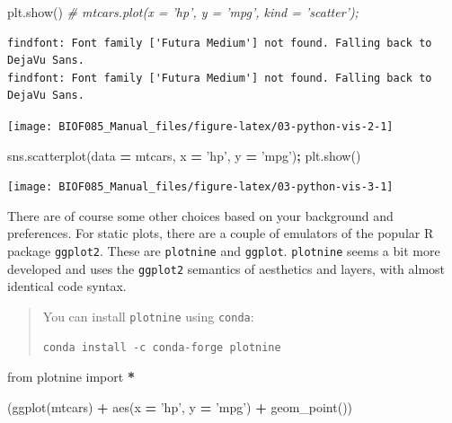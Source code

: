 \documentclass[
  letterpaper,
]{scrbook}
\newenvironment{Shaded}{\begin{snugshade}}{\end{snugshade}}
\newcommand{\CommentTok}[1]{\textcolor[rgb]{0.56,0.35,0.01}{\textit{#1}}}
\newcommand{\ImportTok}[1]{#1}
\newcommand{\NormalTok}[1]{#1}
\newcommand{\OperatorTok}[1]{\textcolor[rgb]{0.81,0.36,0.00}{\textbf{#1}}}
\newcommand{\StringTok}[1]{\textcolor[rgb]{0.31,0.60,0.02}{#1}}
\begin{document}
\begin{Shaded}
\begin{Highlighting}[]
\NormalTok{plt.show()}
\CommentTok{# mtcars.plot(x = 'hp', y = 'mpg', kind = 'scatter');}
\end{Highlighting}
\end{Shaded}

\begin{verbatim}
findfont: Font family ['Futura Medium'] not found. Falling back to DejaVu Sans.
findfont: Font family ['Futura Medium'] not found. Falling back to DejaVu Sans.
\end{verbatim}

\begin{center}\texttt{[image: BIOF085\_Manual\_files/figure-latex/03-python-vis-2-1]} \end{center}

\begin{Shaded}
\begin{Highlighting}[]
\NormalTok{sns.scatterplot(data }\OperatorTok{=}\NormalTok{ mtcars, x }\OperatorTok{=} \StringTok{'hp'}\NormalTok{, y }\OperatorTok{=} \StringTok{'mpg'}\NormalTok{)}\OperatorTok{;}
\NormalTok{plt.show()}
\end{Highlighting}
\end{Shaded}

\begin{center}\texttt{[image: BIOF085\_Manual\_files/figure-latex/03-python-vis-3-1]} \end{center}

There are of course some other choices based on your background and preferences. For static plots, there are a couple of emulators of the popular R package \texttt{ggplot2}. These are \texttt{plotnine} and \texttt{ggplot}. \texttt{plotnine} seems a bit more developed and uses the \texttt{ggplot2} semantics of aesthetics and layers, with almost identical code syntax.

\begin{quote}
You can install \texttt{plotnine} using \texttt{conda}:

\begin{verbatim}
conda install -c conda-forge plotnine
\end{verbatim}
\end{quote}

\begin{Shaded}
\begin{Highlighting}[]
\ImportTok{from}\NormalTok{ plotnine }\ImportTok{import} \OperatorTok{*}

\NormalTok{(ggplot(mtcars) }\OperatorTok{+} 
\NormalTok{  aes(x }\OperatorTok{=} \StringTok{'hp'}\NormalTok{, y }\OperatorTok{=} \StringTok{'mpg'}\NormalTok{) }\OperatorTok{+}
\NormalTok{  geom_point())}
\end{Highlighting}
\end{Shaded}
\end{document}
